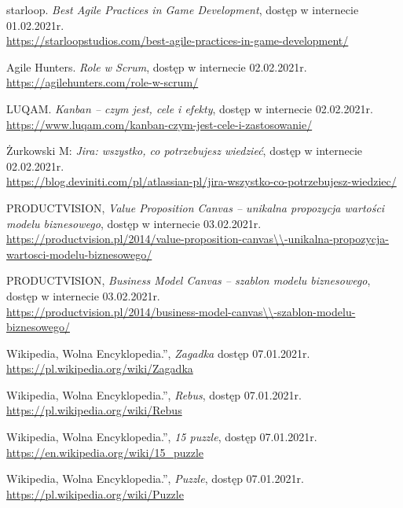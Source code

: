 \documentclass[oneside,polski,logo]{amuthesis}
\begin{document}
\begin{thebibliography}{100}
starloop. \emph{Best Agile Practices in Game Development}, dostęp w internecie 01.02.2021r.\\
\url{https://starloopstudios.com/best-agile-practices-in-game-development/}

Agile Hunters. \emph{Role w Scrum}, dostęp w internecie 02.02.2021r.\\
\url{https://agilehunters.com/role-w-scrum/}

LUQAM. \emph{Kanban – czym jest, cele i efekty}, dostęp w internecie 02.02.2021r.\\
\url{https://www.luqam.com/kanban-czym-jest-cele-i-zastosowanie/}

Żurkowski M: \emph{Jira: wszystko, co potrzebujesz wiedzieć}, dostęp w internecie 02.02.2021r.\\
\url{https://blog.deviniti.com/pl/atlassian-pl/jira-wszystko-co-potrzebujesz-wiedziec/}

PRODUCTVISION, \emph{Value Proposition Canvas – unikalna propozycja wartości modelu biznesowego}, dostęp w internecie 03.02.2021r.\\
\url{https://productvision.pl/2014/value-proposition-canvas\\-unikalna-propozycja-wartosci-modelu-biznesowego/}

PRODUCTVISION, \emph{Business Model Canvas – szablon modelu biznesowego}, dostęp w internecie 03.02.2021r.\\
\url{https://productvision.pl/2014/business-model-canvas\\-szablon-modelu-biznesowego/}

Wikipedia, Wolna Encyklopedia.”, \emph{Zagadka} dostęp 07.01.2021r.
\\ \url{https://pl.wikipedia.org/wiki/Zagadka}

Wikipedia, Wolna Encyklopedia.”, \emph{Rebus}, dostęp 07.01.2021r.
\\ \url{https://pl.wikipedia.org/wiki/Rebus}

Wikipedia, Wolna Encyklopedia.”, \emph{15 puzzle}, dostęp 07.01.2021r.
\\ \url{https://en.wikipedia.org/wiki/15\_puzzle}

Wikipedia, Wolna Encyklopedia.”, \emph{Puzzle}, dostęp 07.01.2021r.
\\ \url{https://pl.wikipedia.org/wiki/Puzzle}


\end{thebibliography}
\end{document}
